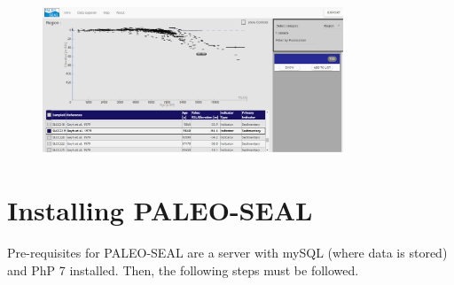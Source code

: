 \documentclass[a4paper,fleqn]{cas-dc}
\begin{document}
\begin{figure}
	\centering
	\includegraphics[width=0.8\textwidth]{figs/Figure2.png}
	\caption{}
	\label{fig:2}
\end{figure}

\section{Installing PALEO-SEAL}
Pre-requisites for PALEO-SEAL are a server with mySQL (where data is stored) and PhP 7 installed. Then, the following steps must be followed.
\end{document}
